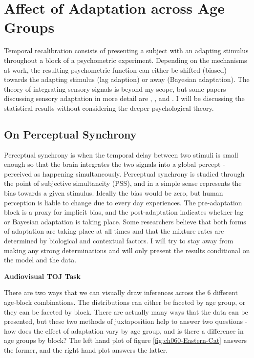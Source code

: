\documentclass[11pt, oneside, openany]{scrbook}
\begin{document}
\hypertarget{affect-of-adaptation-across-age-groups}{%
\section{Affect of Adaptation across Age Groups}\label{affect-of-adaptation-across-age-groups}}

Temporal recalibration consists of presenting a subject with an adapting stimulus throughout a block of a psychometric experiment. Depending on the mechanisms at work, the resulting psychometric function can either be shifted (biased) towards the adapting stimulus (lag adaption) or away (Bayesian adaptation). The theory of integrating sensory signals is beyond my scope, but some papers discussing sensory adaptation in more detail are \citet{miyazaki2006bayesian}, \citet{sato2011bayesian}, and \citet{stocker2005sensory}. I will be discussing the statistical results without considering the deeper psychological theory.

\hypertarget{on-perceptual-synchrony}{%
\subsection{On Perceptual Synchrony}\label{on-perceptual-synchrony}}

Perceptual synchrony is when the temporal delay between two stimuli is small enough so that the brain integrates the two signals into a global percept - perceived as happening simultaneously. Perceptual synchrony is studied through the point of subjective simultaneity (PSS), and in a simple sense represents the bias towards a given stimulus. Ideally the bias would be zero, but human perception is liable to change due to every day experiences. The pre-adaptation block is a proxy for implicit bias, and the post-adaptation indicates whether lag or Bayesian adaptation is taking place. Some researchers believe that both forms of adaptation are taking place at all times and that the mixture rates are determined by biological and contextual factors. I will try to stay away from making any strong determinations and will only present the results conditional on the model and the data.

\textbf{Audiovisual TOJ Task}

There are two ways that we can visually draw inferences across the 6 different age-block combinations. The distributions can either be faceted by age group, or they can be faceted by block. There are actually many ways that the data can be presented, but these two methods of juxtaposition help to answer two questions - how does the effect of adaptation vary by age group, and is there a difference in age groups by block? The left hand plot of figure \ref{fig:ch060-Eastern-Cat} answers the former, and the right hand plot answers the latter.
\end{document}
